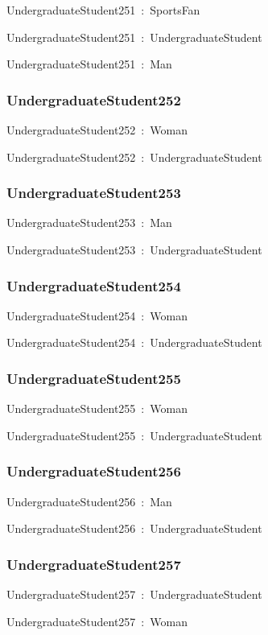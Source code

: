 \documentclass{article}
\begin{document}
UndergraduateStudent251~:~SportsFan

UndergraduateStudent251~:~UndergraduateStudent

UndergraduateStudent251~:~Man

\subsubsection*{UndergraduateStudent252}

UndergraduateStudent252~:~Woman

UndergraduateStudent252~:~UndergraduateStudent

\subsubsection*{UndergraduateStudent253}

UndergraduateStudent253~:~Man

UndergraduateStudent253~:~UndergraduateStudent

\subsubsection*{UndergraduateStudent254}

UndergraduateStudent254~:~Woman

UndergraduateStudent254~:~UndergraduateStudent

\subsubsection*{UndergraduateStudent255}

UndergraduateStudent255~:~Woman

UndergraduateStudent255~:~UndergraduateStudent

\subsubsection*{UndergraduateStudent256}

UndergraduateStudent256~:~Man

UndergraduateStudent256~:~UndergraduateStudent

\subsubsection*{UndergraduateStudent257}

UndergraduateStudent257~:~UndergraduateStudent

UndergraduateStudent257~:~Woman
\end{document}
